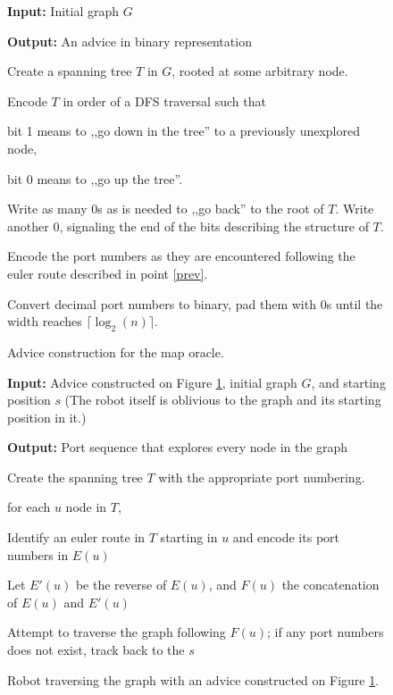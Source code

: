 \documentclass{article}
\begin{document}
\begin{figure}
  \textbf{Input:} Initial graph $G$

  \textbf{Output:} An advice in binary representation
  \vspace{1em}

  \begin{compactenum}
  \item Create a spanning tree $T$ in $G$, rooted at some arbitrary node.
  \item \label{prev}Encode $T$ in order of a DFS traversal such that
    \begin{compactenum}
    \item bit 1 means to ,,go down in the tree'' to a previously unexplored node,
    \item bit 0 means to ,,go up the tree''.
    \end{compactenum}
  \item Write as many 0s as is needed to ,,go back'' to the root of $T$. Write another 0, signaling the end of the bits describing the structure of $T$.
  \item Encode the port numbers as they are encountered following the euler route described in point \ref{prev}.
  \item Convert decimal port numbers to binary, pad them with 0s until the width reaches $\lceil\log_2(n)\rceil$.
  \end{compactenum}
  \caption{Advice construction for the map oracle.}
  \label{fig:encoding-alg}
\end{figure}


\begin{figure}
  \textbf{Input:} Advice constructed on Figure \ref{fig:encoding-alg}, initial graph $G$, and starting position $s$ (The robot itself is oblivious to the graph and its starting position in it.)

  \textbf{Output:} Port sequence that explores every node in the graph
  \vspace{1em}

  \begin{compactenum}
  \item Create the spanning tree $T$ with the appropriate port numbering.
  \item for each $u$ node in $T$,    
    \begin{compactenum}
      \item Identify an euler route in $T$ starting in $u$ and encode its port numbers in $E(u)$
      \item Let $E'(u)$ be the reverse of $E(u)$, and $F(u)$ the concatenation of $E(u)$ and $E'(u)$
      \item Attempt to traverse the graph following $F(u)$; if any port numbers does not exist, track back to the $s$
    \end{compactenum}
  \end{compactenum}
  \caption{Robot traversing the graph with an advice constructed on Figure \ref{fig:encoding-alg}.}
  \label{fig:ulgt-algorithm}
\end{figure}
\end{document}
